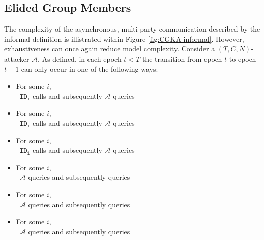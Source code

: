 \hypertarget{elided-group-members}{%
\subsection{Elided Group Members}\label{elided-group-members}}

The complexity of the asynchronous, multi-party communication described by the informal \CGKAsec definition is illistrated within Figure \ref{fig:CGKA-informal}.
However, exhaustiveness can once again reduce model complexity.
Consider a \((T, C, N)\)-attacker \(\mathcal{A}\).
As defined, in each epoch $t < T$ the transition from epoch $t$ to epoch $t+1$ can only occur in one of the following ways:

\begin{itemize}
  \item For some \(i\),\\~\hspace{4em}\(\mathtt{ID_i}\) calls  and subsequently \(\mathcal{A}\) queries 
  \item For some \(i\),\\~\hspace{4em}\(\mathtt{ID_i}\) calls  and subsequently \(\mathcal{A}\) queries 
  \item For some \(i\),\\~\hspace{4em}\(\mathtt{ID_i}\) calls  and subsequently \(\mathcal{A}\) queries 
  \item For some \(i\),\\~\hspace{4em}\(\mathcal{A}\) queries     and subsequently queries 
  \item For some \(i\),\\~\hspace{4em}\(\mathcal{A}\) queries  and subsequently queries 
  \item For some \(i\),\\~\hspace{4em}\(\mathcal{A}\) queries  and subsequently queries 
\end{itemize}

